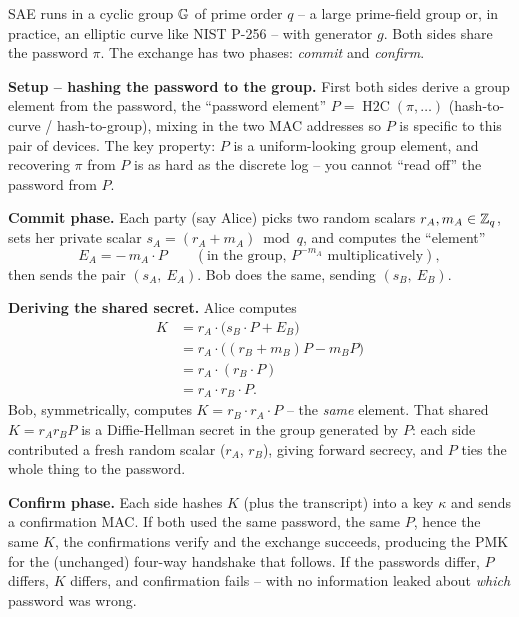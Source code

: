 SAE runs in a cyclic group $\mathbb{G}$ of prime order $q$ -- a large prime-field group or,
in practice, an elliptic curve like NIST P-256 -- with generator $g$. Both sides
share the password $\pi$. The exchange has two phases: \emph{commit} and
\emph{confirm}.

\textbf{Setup -- hashing the password to the group.} First both sides derive a
group element from the password, the ``password element'' $P = \operatorname{H2C}(\pi,
\ldots)$ (hash-to-curve / hash-to-group), mixing in the two MAC addresses so $P$ is
specific to this pair of devices. The key property: $P$ is a uniform-looking
group element, and recovering $\pi$ from $P$ is as hard as the discrete log -- you
cannot ``read off'' the password from $P$.

\textbf{Commit phase.} Each party (say Alice) picks two random scalars $r_A,
m_A \in \mathbb{Z}_q$, sets her private scalar $s_A = (r_A + m_A) \bmod q$, and computes
the ``element''
\[
  E_A = -\,m_A \cdot P \qquad (\text{in the group, } P^{-m_A}\text{ multiplicatively}),
\]
then sends the pair $(s_A,\ E_A)$. Bob does the same, sending $(s_B,\ E_B)$.

\textbf{Deriving the shared secret.} Alice computes
\begin{align*}
  K &= r_A \cdot \bigl(s_B \cdot P + E_B\bigr) \\
    &= r_A \cdot \bigl((r_B + m_B)P - m_B P\bigr) \\
    &= r_A \cdot (r_B \cdot P) \\
    &= r_A \cdot r_B \cdot P.
\end{align*}
Bob, symmetrically, computes $K = r_B \cdot r_A \cdot
P$ -- the \emph{same} element. That shared $K = r_A r_B P$ is a Diffie-Hellman
secret in the group generated by $P$: each side contributed a fresh random scalar
($r_A$, $r_B$), giving forward secrecy, and $P$ ties the whole thing to the
password.

\textbf{Confirm phase.} Each side hashes $K$ (plus the transcript) into a key
$\kappa$ and sends a confirmation MAC. If both used the same password, the same
$P$, hence the same $K$, the confirmations verify and the exchange succeeds,
producing the PMK for the (unchanged) four-way handshake that follows. If the
passwords differ, $P$ differs, $K$ differs, and confirmation fails -- with no
information leaked about \emph{which} password was wrong.

